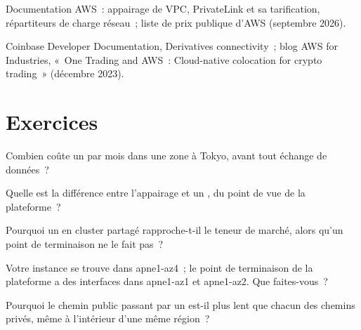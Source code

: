 \begin{omsources}
\item Documentation AWS~: appairage de VPC, PrivateLink et sa tarification, répartiteurs de charge réseau~; liste de prix publique d'AWS (septembre 2026).
\item Coinbase Developer Documentation, Derivatives connectivity~; blog AWS for Industries, «~One Trading and AWS~: Cloud-native colocation for crypto
trading~» (décembre 2023).
\end{omsources}

\section{Exercices}

\begin{exercise}[$\star$]\label{exo:nw:private-connectivity-to-crypto-venues:1}
Combien coûte un  par mois dans une zone à Tokyo, avant tout échange de données~?
\end{exercise}

\begin{exercise}[$\star$]\label{exo:nw:private-connectivity-to-crypto-venues:2}
Quelle est la différence entre l'appairage et un , du point de vue de la plateforme~?
\end{exercise}

\begin{exercise}[$\star$]\label{exo:nw:private-connectivity-to-crypto-venues:3}
Pourquoi un  en cluster partagé rapproche-t-il le teneur de marché, alors qu'un point de terminaison ne le fait pas~?
\end{exercise}

\begin{exercise}[$\star\star$]\label{exo:nw:private-connectivity-to-crypto-venues:4}
Votre instance se trouve dans apne1-az4~; le point de terminaison de la plateforme a des interfaces dans apne1-az1 et apne1-az2. Que faites-vous~?
\end{exercise}

\begin{exercise}[$\star\star$]\label{exo:nw:private-connectivity-to-crypto-venues:5}
Pourquoi le chemin public passant par un  est-il plus lent que chacun des chemins privés, même à l'intérieur d'une même région~?
\end{exercise}

